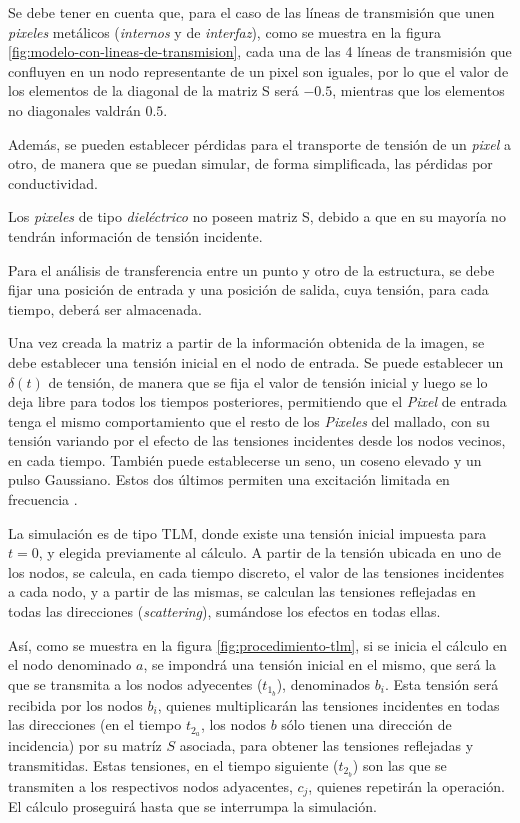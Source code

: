 \begin{enumerate}
	Se debe tener en cuenta que, para el caso de las líneas de transmisión que unen \textit{pixeles} metálicos (\textit{internos} y de \textit{interfaz}), como se muestra en la figura \ref{fig:modelo-con-lineas-de-transmision}, cada una de las 4 líneas de transmisión que confluyen en un nodo representante de un pixel son iguales, por lo que el valor de los elementos de la diagonal de la matriz S será $-0.5$, mientras que los elementos no diagonales valdrán $0.5$.
	
	Además, se pueden establecer pérdidas para el transporte de tensión de un \textit{pixel} a otro, de manera que se puedan simular, de forma simplificada, las pérdidas por conductividad.
	
	Los \textit{pixeles} de tipo \textit{dieléctrico} no poseen matriz S, debido a que en su mayoría no tendrán información de tensión incidente.
\end{enumerate}


Para el análisis de transferencia entre un punto y otro de la estructura, se debe fijar una posición de entrada y una posición de salida, cuya tensión, para cada tiempo, deberá ser almacenada.

Una vez creada la matriz a partir de la información obtenida de la imagen, se debe establecer una tensión inicial en el nodo de entrada. Se puede establecer un $\delta(t)$ de tensión, de manera que se fija el valor de tensión inicial y luego se lo deja libre para todos los tiempos posteriores, permitiendo que el \textit{Pixel} de entrada tenga el mismo comportamiento que el resto de los \textit{Pixeles} del mallado, con su tensión variando por el efecto de las tensiones incidentes desde los nodos vecinos, en cada tiempo. También puede establecerse un seno, un coseno elevado y un pulso Gaussiano. Estos dos últimos permiten una excitación limitada en frecuencia \cite{Barthia:Handbook}.

La simulación es de tipo TLM, donde existe una tensión inicial impuesta para $t=0$, y elegida previamente al cálculo. A partir de la tensión ubicada en uno de los nodos, se calcula, en cada tiempo discreto, el valor de las tensiones incidentes a cada nodo, y a partir de las mismas, se calculan las tensiones reflejadas en todas las direcciones (\textit{scattering}), sumándose los efectos en todas ellas.

Así, como se muestra en la figura \ref{fig:procedimiento-tlm}, si se inicia el cálculo en el nodo denominado $a$, se impondrá una tensión inicial en el mismo, que será la que se transmita a los nodos adyecentes ($t_{1_b}$), denominados $b_i$. Esta tensión será recibida por los nodos $b_i$, quienes multiplicarán las tensiones incidentes en todas las direcciones (en el tiempo $t_{2_a}$, los nodos $b$ sólo tienen una dirección de incidencia) por su matríz $S$ asociada, para obtener las tensiones reflejadas y transmitidas. Estas tensiones, en el tiempo siguiente ($t_{2_b}$) son las que se transmiten a los respectivos nodos adyacentes, $c_j$, quienes repetirán la operación. El cálculo proseguirá hasta que se interrumpa la simulación.


